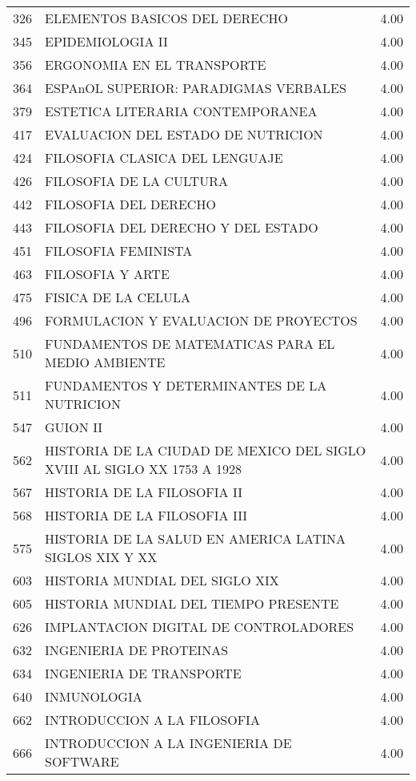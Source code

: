 \documentclass[12pt]{article}
\begin{document}
\begin{table}[ht]
{\begin{tabular}{rlr}
  326 & ELEMENTOS BASICOS DEL DERECHO & 4.00 \\ 
  345 & EPIDEMIOLOGIA II & 4.00 \\ 
  356 & ERGONOMIA EN EL TRANSPORTE & 4.00 \\ 
  364 & ESPAnOL SUPERIOR: PARADIGMAS VERBALES & 4.00 \\ 
  379 & ESTETICA LITERARIA CONTEMPORANEA & 4.00 \\ 
  417 & EVALUACION DEL ESTADO DE NUTRICION & 4.00 \\ 
  424 & FILOSOFIA CLASICA DEL LENGUAJE & 4.00 \\ 
  426 & FILOSOFIA DE LA CULTURA & 4.00 \\ 
  442 & FILOSOFIA DEL DERECHO & 4.00 \\ 
  443 & FILOSOFIA DEL DERECHO Y DEL ESTADO & 4.00 \\ 
  451 & FILOSOFIA FEMINISTA & 4.00 \\ 
  463 & FILOSOFIA Y ARTE & 4.00 \\ 
  475 & FISICA DE LA CELULA & 4.00 \\ 
  496 & FORMULACION Y EVALUACION DE PROYECTOS & 4.00 \\ 
  510 & FUNDAMENTOS DE MATEMATICAS PARA EL MEDIO AMBIENTE & 4.00 \\ 
  511 & FUNDAMENTOS Y DETERMINANTES DE LA NUTRICION & 4.00 \\ 
  547 & GUION II & 4.00 \\ 
  562 & HISTORIA DE LA CIUDAD DE MEXICO DEL SIGLO XVIII AL SIGLO XX 1753 A 1928 & 4.00 \\ 
  567 & HISTORIA DE LA FILOSOFIA II & 4.00 \\ 
  568 & HISTORIA DE LA FILOSOFIA III & 4.00 \\ 
  575 & HISTORIA DE LA SALUD EN AMERICA LATINA SIGLOS XIX Y XX & 4.00 \\ 
  603 & HISTORIA MUNDIAL DEL SIGLO XIX & 4.00 \\ 
  605 & HISTORIA MUNDIAL DEL TIEMPO PRESENTE & 4.00 \\ 
  626 & IMPLANTACION DIGITAL DE CONTROLADORES & 4.00 \\ 
  632 & INGENIERIA DE PROTEINAS & 4.00 \\ 
  634 & INGENIERIA DE TRANSPORTE & 4.00 \\ 
  640 & INMUNOLOGIA & 4.00 \\ 
  662 & INTRODUCCION A LA FILOSOFIA & 4.00 \\ 
  666 & INTRODUCCION A LA INGENIERIA DE SOFTWARE & 4.00 \\ 

\end{tabular}}
\end{table}
\end{document}
